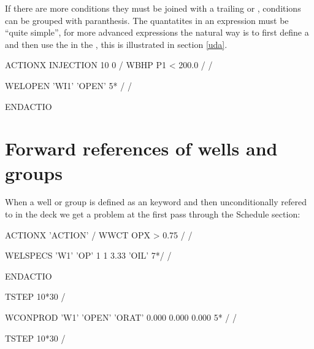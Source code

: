 If there are more conditions they must be joined with a trailing  or
, conditions can be grouped with paranthesis. The quantatites in an
\actionx{} expression must be ``quite simple'', for more advanced expressions
the natural way is to first define a \udq{} and then use the  in the
\actionx{}, this is illustrated in section \ref{uda}.




\begin{deck}
ACTIONX
  INJECTION 10 0 /
  WBHP P1 < 200.0 /
  /

  WELOPEN
  'WI1' 'OPEN' 5* /
  /

  ENDACTIO
\end{deck}




\section{Forward references of wells and groups}
When a well or group is defined as an \actionx{} keyword and then
unconditionally refered to in the deck we get a problem at the first pass
through the Schedule section:

\begin{deck}
ACTIONX
   'ACTION' /
   WWCT OPX  > 0.75 /
/

WELSPECS
  'W1'  'OP'  1 1 3.33  'OIL' 7*/
/

ENDACTIO

TSTEP
  10*30 /

WCONPROD
 'W1'      'OPEN'      'ORAT'      0.000      0.000      0.000  5* /
/

TSTEP
  10*30 /

\end{deck}

